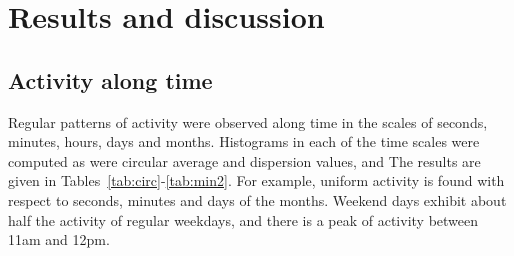 \documentclass[%
	aip,
	jmp,%
	amsmath,amssymb,
	reprint,%
]{revtex4-1}
\begin{document}
																																																																																\section{Results and discussion}\label{sec:results}
																																																																																\subsection{Activity along time}\label{constDisc}
																																																																																Regular patterns of activity were observed along time
																																																																																in the scales of seconds, minutes, hours, days and months.
																																																																																Histograms in each of the time scales were computed as were circular average and dispersion values, and The results are given in Tables~\ref{tab:circ}-\ref{tab:min2}. For example, uniform activity is found with respect to seconds, minutes and days of the months. Weekend days exhibit about half the activity of regular weekdays, and there is a peak of activity between 11am and 12pm.
\end{document}
